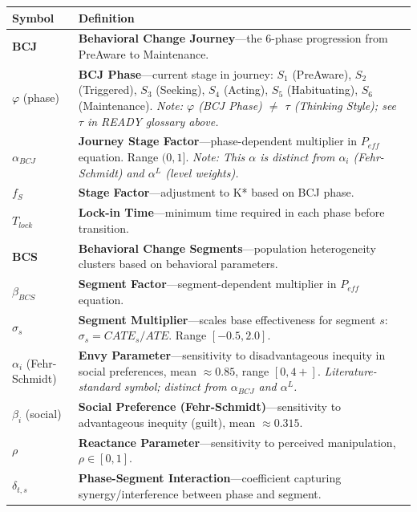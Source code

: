 \begin{longtable}{@{}p{2.8cm}p{10cm}@{}}
\toprule
\textbf{Symbol} & \textbf{Definition} \\
\midrule
\endhead
\textbf{BCJ} & \textbf{Behavioral Change Journey}---the 6-phase progression from PreAware to Maintenance. \\[6pt]
$\varphi$ (phase) & \textbf{BCJ Phase}---current stage in journey: $S_1$ (PreAware), $S_2$ (Triggered), $S_3$ (Seeking), $S_4$ (Acting), $S_5$ (Habituating), $S_6$ (Maintenance). \textit{Note: $\varphi$ (BCJ Phase) $\neq$ $\tau$ (Thinking Style); see $\tau$ in READY glossary above.} \\[6pt]
$\alpha_{BCJ}$ & \textbf{Journey Stage Factor}---phase-dependent multiplier in $P_{eff}$ equation. Range $(0, 1]$. \textit{Note: This $\alpha$ is distinct from $\alpha_i$ (Fehr-Schmidt) and $\alpha^L$ (level weights).} \\[6pt]
$f_S$ & \textbf{Stage Factor}---adjustment to K* based on BCJ phase. \\[6pt]
$T_{lock}$ & \textbf{Lock-in Time}---minimum time required in each phase before transition. \\[6pt]
\textbf{BCS} & \textbf{Behavioral Change Segments}---population heterogeneity clusters based on behavioral parameters. \\[6pt]
$\beta_{BCS}$ & \textbf{Segment Factor}---segment-dependent multiplier in $P_{eff}$ equation. \\[6pt]
$\sigma_s$ & \textbf{Segment Multiplier}---scales base effectiveness for segment $s$: $\sigma_s = CATE_s / ATE$. Range $[-0.5, 2.0]$. \\[6pt]
$\alpha_i$ (Fehr-Schmidt) & \textbf{Envy Parameter}---sensitivity to disadvantageous inequity in social preferences, mean $\approx 0.85$, range $[0, 4+]$. \textit{Literature-standard symbol; distinct from $\alpha_{BCJ}$ and $\alpha^L$.} \\[6pt]
$\beta_i$ (social) & \textbf{Social Preference (Fehr-Schmidt)}---sensitivity to advantageous inequity (guilt), mean $\approx 0.315$. \\[6pt]
$\rho$ & \textbf{Reactance Parameter}---sensitivity to perceived manipulation, $\rho \in [0,1]$. \\[6pt]
$\delta_{t,s}$ & \textbf{Phase-Segment Interaction}---coefficient capturing synergy/interference between phase and segment. \\
\bottomrule
\end{longtable}


